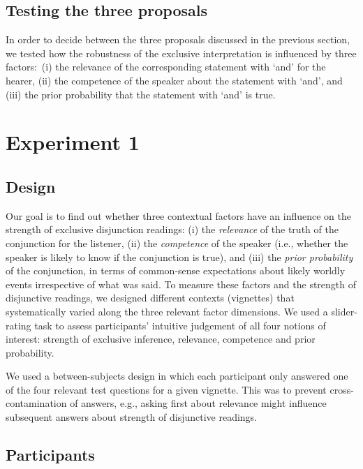 \documentclass[12pt]{article}
\begin{document}
\subsection*{Testing the three proposals}

In order to decide between the three proposals discussed in the previous section, we tested how the robustness of the exclusive interpretation is influenced by three factors:\ (i) the relevance of the corresponding statement with `and' for the hearer, (ii) the competence of the speaker about the statement with `and', and (iii) the prior probability that the statement with `and' is true. 


\section{Experiment 1}
\subsection*{Design}

Our goal is to find out whether three contextual factors have an influence on the strength of
exclusive disjunction readings: (i) the \emph{relevance} of the truth of the conjunction for
the listener, (ii) the \emph{competence} of the speaker (i.e., whether the speaker is likely to
know if the conjunction is true), and (iii) the \emph{prior probability} of the conjunction, in
terms of common-sense expectations about likely worldly events irrespective of what was
said. To measure these factors and the strength of disjunctive readings, we designed different
contexts (vignettes) that systematically varied along the three relevant factor dimensions.  We
used a slider-rating task to assess participants' intuitive judgement of all four notions of
interest: strength of exclusive inference, relevance, competence and prior probability.

We used a between-subjects design in which each participant only answered one of the four
relevant test questions for a given vignette. This was to prevent cross-contamination of
answers, e.g., asking first about relevance might influence subsequent answers about strength
of disjunctive readings.


\subsection*{Participants}
\end{document}
